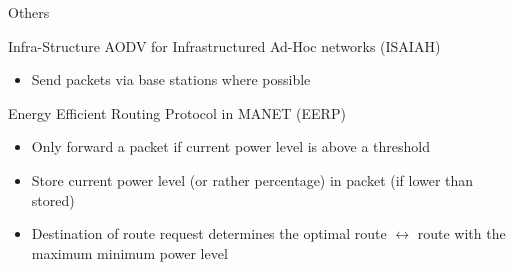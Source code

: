 \documentclass{beamer}
\begin{document}
\begin{frame}{Others}
\begin{block}{Infra-Structure AODV for Infrastructured Ad-Hoc networks (ISAIAH)\cite{lindgren2002infrastructured}}
\begin{itemize}
    \item Send packets via base stations where possible
\end{itemize}
\end{block}
\begin{block}{Energy Efficient Routing Protocol in MANET (EERP)\cite{main2}}
\begin{itemize}
    \item Only forward a packet if current power level is above a threshold
    \item Store current power level (or rather percentage) in packet (if lower than stored)
    \item Destination of route request determines the optimal route
        $\leftrightarrow$ route with the maximum minimum power level
\end{itemize}
\end{block}
\end{frame}
\end{document}
